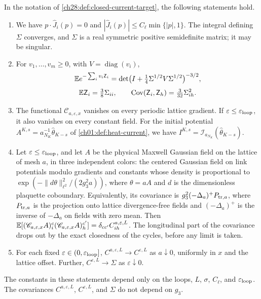 \begin{lemma}\label{ch28:lem:free-current-covariance}
In the notation of \cref{ch28:def:closed-current-target}, the following statements hold.
\begin{enumerate}
\item We have $p\cdot\widehat J_i(p)=0$ and $|\widehat J_i(p)|\le C_\ell\min\{|p|,1\}$. The integral defining $\Sigma$ converges, and $\Sigma$ is a real symmetric positive semidefinite matrix; it may be singular.
\item For $v_1,\dots,v_m\ge0$, with $V=\operatorname{diag}(v_i)$,
\[
 \mathbb E e^{-\sum_iv_i\mathsf Z_i}=\det\bigl(I+\tfrac14\Sigma^{1/2}V\Sigma^{1/2}\bigr)^{-3/2},
\]
\[
 \mathbb E\mathsf Z_i=\tfrac38\Sigma_{ii},\qquad \operatorname{Cov}(\mathsf Z_i,\mathsf Z_h)=\tfrac3{32}\Sigma_{ih}^2.
\]
\item The functional $\mathscr C_{a,\varepsilon,x}$ vanishes on every periodic lattice gradient. If $\varepsilon\le\varepsilon_{\rm loop}$, it also vanishes on every constant field. For the initial potential $A^{K,s}=a_{N_K}^{-1}\widehat\theta_{K-s}$ of \cref{ch01:def:heat-current}, we have $I^{K,s}=\mathcal I_{a_{N_K}}(\widehat\theta_{K-s})$.
\item Let $\varepsilon\le\varepsilon_{\rm loop}$, and let $A$ be the physical Maxwell Gaussian field on the lattice of mesh $a$, in three independent colors: the centered Gaussian field on link potentials modulo gradients and constants whose density is proportional to $\exp(-\|d\theta\|_{\ell^2}^2/(2g_3^2a))$, where $\theta=aA$ and $d$ is the dimensionless plaquette coboundary. Equivalently, its covariance is $g_3^2(-\Delta_a)^+P_{{\rm tr},a}$, where $P_{{\rm tr},a}$ is the projection onto lattice divergence-free fields and $(-\Delta_a)^+$ is the inverse of $-\Delta_a$ on fields with zero mean. Then $\mathbb E[(\mathscr C_{a,\varepsilon,x}A)_i^c(\mathscr C_{a,\varepsilon,x}A)_h^{c'}]=\delta_{cc'}C^{a,\varepsilon,L}_{ih}$. The longitudinal part of the covariance drops out by the exact closedness of the cycles, before any limit is taken.
\item For each fixed $\varepsilon\in(0,\varepsilon_{\rm loop}]$, $C^{a,\varepsilon,L}\to C^{\varepsilon,L}$ as $a\downarrow0$, uniformly in $x$ and the lattice offset. Further, $C^{\varepsilon,L}\to\Sigma$ as $\varepsilon\downarrow0$.
\end{enumerate}
The constants in these statements depend only on the loops, $L$, $\sigma$, $C_\ell$, and $\varepsilon_{\rm loop}$. The covariances $C^{a,\varepsilon,L}$, $C^{\varepsilon,L}$, and $\Sigma$ do not depend on $g_3$.
\end{lemma}

